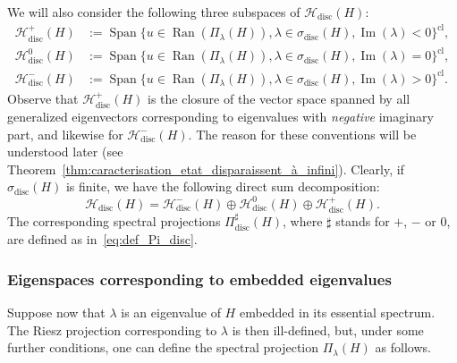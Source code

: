 \documentclass[10pt]{amsart}
\theoremstyle{definition}\newtheorem{defi}[theo]{Definition}\newtheorem{rema}[theo]{Remark}\newtheorem{exam}[theo]{Example}\newtheorem{exem}[theo]{Example}\newtheorem{nota}[theo]{Notation}
\newcommand{\Hi}{\mathcal{H}}
\newcommand{\disc}{\mathrm{disc}}
\DeclareMathOperator{\Ran}{Ran}
\DeclareMathOperator{\Span}{Span}
\DeclareMathOperator{\im}{Im}
\begin{document}
We will also consider the following three subspaces of $\Hi_\disc(H)$:
\begin{align}
\Hi_\disc^+(H)&:=\Span\big\lbrace u\in\Ran\left(\Pi_\lambda(H)\right),\lambda\in\sigma_\disc(H),\im(\lambda)<0\big\rbrace^{\mathrm{cl}},\label{eq:def_etat_discret_+}
\\
\Hi_\disc^0(H)&:=\Span\big\lbrace u\in\Ran\left(\Pi_\lambda(H)\right),\lambda\in\sigma_\disc(H),\im(\lambda)=0\big\rbrace^{\mathrm{cl}},\label{eq:def_etat_discret_0}
\\
\Hi_\disc^-(H)&:=\Span\big\lbrace u\in\Ran\left(\Pi_\lambda(H)\right),\lambda\in\sigma_\disc(H),\im(\lambda)>0\big\rbrace^{\mathrm{cl}}.\label{eq:def_etat_discret_-}
\end{align}
Observe that $\Hi_\disc^+(H)$ is the closure of the vector space spanned by all generalized eigenvectors corresponding to eigenvalues with \emph{negative} imaginary part, and likewise for $\Hi_\disc^-(H)$. The reason for these conventions will be understood later (see Theorem~\ref{thm:caracterisation_etat_disparaissent_à_infini}). Clearly, if $\sigma_{\disc}(H)$ is finite, we have the following direct sum decomposition:
\begin{equation*}
\Hi_\disc(H)=\Hi_\disc^-(H)\oplus\Hi_\disc^0(H)\oplus\Hi_\disc^+(H).
\end{equation*}
The corresponding spectral projections $\Pi_{\disc}^\sharp(H)$, where $\sharp$ stands for $+$, $-$ or $0$, are defined as in~\eqref{eq:def_Pi_disc}.

\subsubsection{Eigenspaces corresponding to embedded eigenvalues}\label{subsubsec:embedded}
Suppose now that $\lambda$ is an eigenvalue of $H$ embedded in its essential spectrum. The Riesz projection corresponding to $\lambda$ is then ill-defined, but, under some further conditions, one can define the spectral projection $\Pi_\lambda(H)$ as follows.
\end{document}

